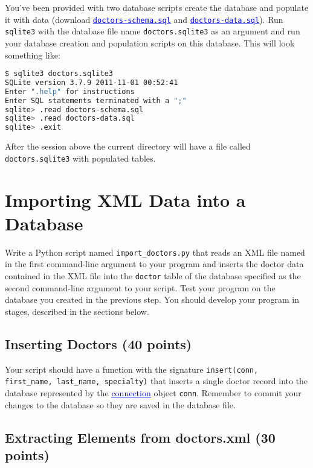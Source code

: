 \documentclass[12pt]{article}
\newcommand{\link}[2]{\href{#1}{\textcolor{blue}{\underline{#2}}}}
\begin{document}
You've been provided with two database scripts create the database and populate it with data (download \link{http://www.cc.gatech.edu/~simpkins/teaching/gatech/cs2316/summer2016/hw3/doctors-schema.sql}{{\tt doctors-schema.sql}} and \link{http://www.cc.gatech.edu/~simpkins/teaching/gatech/cs2316/summer2016/hw3/doctors-data.sql}{{\tt doctors-data.sql}}). Run {\tt sqlite3} with the database file name {\tt doctors.sqlite3} as an argument and run your database creation and population scripts on this database.  This will look something like:

\begin{lstlisting}[language=bash]
$ sqlite3 doctors.sqlite3
SQLite version 3.7.9 2011-11-01 00:52:41
Enter ".help" for instructions
Enter SQL statements terminated with a ";"
sqlite> .read doctors-schema.sql
sqlite> .read doctors-data.sql
sqlite> .exit
\end{lstlisting}

After the session above the current directory will have a file called {\tt doctors.sqlite3} with populated tables.

\section{Importing XML Data into a Database}

Write a Python script named {\tt import\_doctors.py} that reads an XML file named in the first command-line argument to your program and inserts the doctor data contained in the XML file into the {\tt doctor} table of the database specified as the second command-line argument to your script.  Test your program on the database you created in the previous step.  You should develop your program in stages, described in the sections below.

\subsection{Inserting Doctors (40 points)}

Your script should have a function with the signature {\tt insert(conn, first\_name, last\_name, specialty)} that inserts a single doctor record into the database represented by the \link{https://docs.python.org/3/library/sqlite3.html?highlight=connection\#connection-objects}{connection} object {\tt conn}.  Remember to commit your changes to the database so they are saved in the database file.

\subsection{Extracting Elements from doctors.xml (30 points)}
\end{document}
